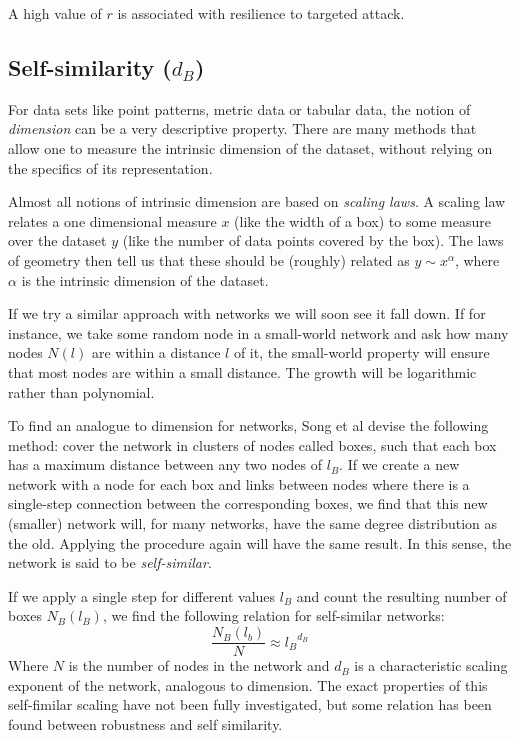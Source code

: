 \documentclass{article}
\theoremstyle{definition}
\begin{document}
A high value of $r$ is associated with resilience to targeted attack.\cite{newman2002assortative}

\subsection*{Self-similarity ($d_B$)}

For data sets like point patterns, metric data or tabular data, the notion of \emph{dimension} can be a very descriptive property. There are many methods that allow one to measure the intrinsic dimension of the dataset, without relying on the specifics of its representation. 

Almost all notions of intrinsic dimension are based on \emph{scaling laws}. A scaling law relates a one dimensional measure $x$ (like the width of a box) to some measure over the dataset $y$ (like the number of data points covered by the box). The laws of geometry then tell us that these should be (roughly) related as $y \sim x^\alpha$, where $\alpha$ is the intrinsic dimension of the dataset.

If we try a similar approach with networks we will soon see it fall down. If for instance, we take some random node in a small-world network and ask how many nodes $N(l)$ are within a distance $l$ of it, the small-world property will ensure that most nodes are within a small distance. The growth will be logarithmic rather than polynomial.

To find an analogue to dimension for networks, Song et al \cite{song2005self} devise the following method: cover the network in clusters of nodes called boxes, such that each box has a maximum distance between any two nodes of $l_B$. If we create a new network with a node for each box and links between nodes where there is a single-step connection between the corresponding boxes, we find that this new (smaller) network will, for many networks, have the same degree distribution as the old. Applying the procedure again will have the same result. In this sense, the network is said to be \emph{self-similar}.

If we apply a single step for different values $l_B$ and count the resulting number of boxes $N_B(l_B)$, we find the following relation for self-similar networks:
\[
\frac{N_B(l_b)}{N} \approx {l_B}^{d_B}
\]
Where $N$ is the number of nodes in the network and $d_B$ is a characteristic scaling exponent of the network, analogous to dimension. The exact properties of this self-fimilar scaling have not been fully investigated, but some relation has been found between robustness and self similarity. \cite{song2006origins}
\end{document}
